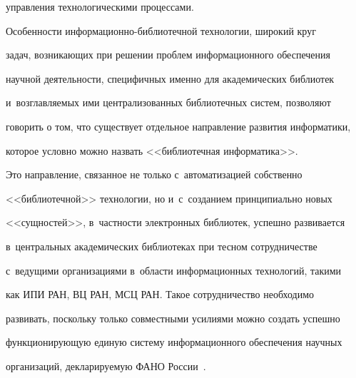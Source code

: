 управления технологическими процессами. 


  


  Особенности информационно-библиотечной технологии, широкий круг 


задач, возникающих при решении проблем информационного обеспечения 


научной деятельности, специфичных именно для академических библиотек 


и~возглавляемых ими централизованных библиотечных систем, позволяют 


говорить о том, что существует отдельное направление развития информатики, 


которое условно можно назвать <<библиотечная информатика>>.


  


  Это направление, связанное не только с~автоматизацией собственно 


<<биб\-лио\-теч\-ной>> технологии, но и~с~созданием принципиально новых 


<<сущностей>>, в~частности электронных библиотек, успешно развивается 


в~центральных академических библиотеках при тесном сотрудничестве 


с~ведущими организациями в~области информационных технологий, такими 


как ИПИ РАН, ВЦ РАН, МСЦ РАН. Такое сотрудничество необходимо 


развивать, поскольку только совместными усилиями можно создать успешно 


функционирующую единую систему информационного обеспечения научных 


организаций, декларируемую ФАНО России~\cite{25-vla}.


  


